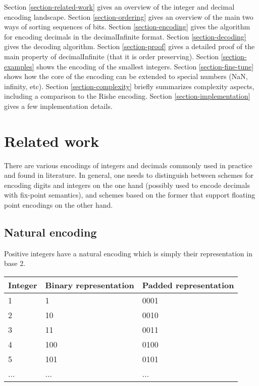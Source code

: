 \documentclass[final,leqno,onefignum,onetabnum]{siamltex1213}
\begin{document}
Section \ref{section-related-work} gives an overview of the integer and decimal encoding landscape.
Section \ref{section-ordering} gives an overview of the main two ways of sorting sequences of bits.
Section \ref{section-encoding} gives the algorithm for encoding decimals in the decimalInfinite format.
Section \ref{section-decoding} gives the decoding algorithm.
Section \ref{section-proof} gives a detailed proof of the main property of decimalInfinite (that it is order preserving).
Section \ref{section-examples} shows the encoding of the smallest integers.
Section \ref{section-fine-tune} shows how the core of the encoding can be extended to special numbers (NaN, infinity, etc).
Section \ref{section-complexity} briefly summarizes complexity aspects, including a comparison to the Rishe encoding.
Section \ref{section-implementation} gives a few implementation details.

\section{Related work}

There are various encodings of integers and decimals commonly used in practice and found in literature. In general, one needs to distinguish between schemes for encoding digits and integers on the one hand (possibly used to encode decimals with fix-point semantics), and schemes based on the former that support floating point encodings on the other hand.

\label{section-related-work}

\subsection{Natural encoding}

Positive integers have a natural encoding which is simply their representation in base 2.


\begin{tabular}{|l|l|l|}
\hline
Integer & Binary representation & Padded representation \\
\hline
1 & 1 & 0001 \\
\hline
2 & 10 & 0010 \\
\hline
3 & 11 & 0011\\
\hline
4 & 100  & 0100 \\
\hline
5 & 101  & 0101\\
\hline
... & ... & ... \\
\hline
\end{tabular}
\end{document}
